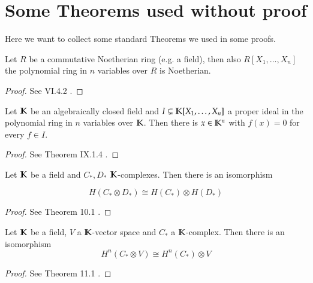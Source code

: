 \appendix
\section{Some Theorems used without proof}

Here we want to collect some standard Theorems we used in some proofs.

\begin{Theorem}
\label{thm:HilbertBasisTheorem}
  Let $R$ be a commutative Noetherian ring (e.g. a field), then also $R[X_1, \ldots, X_n]$ the polynomial 
  ring in $n$ variables over $R$ is Noetherian.
\end{Theorem}
\begin{proof}
 See \cite{Lang2002} VI.4.2 .
\end{proof}



\begin{Theorem}
\label{thm:Nullstellensatz}
 Let $\mathbb{K}$ be an algebraically closed field and \newline $I \subsetneq \mathbb{K}[ X_1, \ldots, X_n]$ 
 a proper ideal in the polynomial ring in $n$ variables over $\mathbb{K}$. Then there is $x \in \mathbb{K}^n$
 with $f(x) = 0$ for every $f \in I$.
\end{Theorem}
\begin{proof}
 See \cite{Lang2002} Theorem IX.1.4 .
\end{proof}


\begin{Theorem}
 \label{thm:KünnethTheorem}
 
 Let $\mathbb{K}$ be a field and $C_* , D_*$ $\mathbb{K}$-complexes. Then there is an isomorphism
 
 $$H( C_* \otimes D_* ) \cong H(C_*) \otimes H(D_*)$$
 
\end{Theorem}
\begin{proof}
 See \cite{MacLane1963} Theorem 10.1 .
\end{proof}

\begin{Theorem}
\label{thm:Universalcoefficients}
 Let $\mathbb{K}$ be a field, $V$ a $\mathbb{K}$-vector space and $C_*$ a $\mathbb{K}$-complex. Then there is an isomorphism
 $$H^n(C_* \otimes V) \cong H^n(C_*) \otimes V$$
\end{Theorem}
\begin{proof}
 See \cite{MacLane1963} Theorem 11.1 .
\end{proof}
